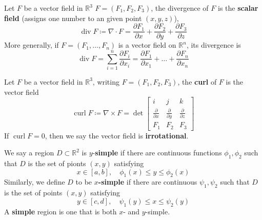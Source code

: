\documentclass[openany]{book}
\newcommand{\R}{\mathbb{R}}
\newcommand{\diverg}{\operatorname{div}}
\newcommand{\curl}{\operatorname{curl}}
\begin{document}
\begin{defn}[divergence]
    Let ${F}$ be a vector field in $\R^3$ $F=(F_1,F_2,F_3)$, the divergence of ${F}$ is the \textbf{scalar field} (assigns one number to an given point $(x, y, z)$), 
    \begin{equation*}
        \diverg F\coloneq\nabla\cdot F=\frac{\partial F_1}{\partial x}+\frac{\partial F_2}{\partial y}+\frac{\partial F_3}{\partial z}
    \end{equation*}
    More generally, if $F=(F_1,\dots, F_n)$ is a vector field on $\R^n$, its divergence is 
    \begin{equation*}
        \diverg F=\sum_{i=1}^n\frac{\partial F_i}{\partial x_i}=\frac{\partial F_1}{\partial x_1}+\dots+\frac{\partial F_n}{\partial x_n}
    \end{equation*}
\end{defn}


\begin{defn}[curl]
    Let $F$ be a vector field in $\R^3$, writing $F=(F_1,F_2,F_3)$, the \textbf{curl} of $F$ is the vector field 
    \begin{equation*}
        \curl F\coloneq\nabla\times F=\det\begin{bmatrix}
            i&j&k\\
            \frac{\partial}{\partial x}&\frac{\partial}{\partial y}&\frac{\partial}{\partial z}\\
            F_1&F_2&F_3
        \end{bmatrix}
    \end{equation*}
    If $\curl F=0$, then we say the vector field is \textbf{irrotational}.
\end{defn}



\begin{defn}
    We say a region $D\subset\R^2$ is \boldmath$y$\unboldmath-\textbf{simple} if there are continuous functions $\phi_1,\phi_2$ such that $D$ is the set of pionts $(x,y)$ satisfying
    \begin{equation*}
        x\in[a,b], \quad  \phi_1(x)\leq y\leq\phi_2(x)
    \end{equation*}
    Similarly, we define $D$ to be \boldmath$x$\textbf{-simple} \unboldmath if there are continuous $\psi_1, \psi_2$ such that $D$ is the set of points $(x,y)$ satisfying 
    \begin{equation*}
        y\in[c,d], \quad \psi_1(y)\leq x\leq\psi_2(y)
    \end{equation*}
    A \textbf{simple} region is one that is both $x$- and $y$-simple.
\end{defn}
\end{document}
